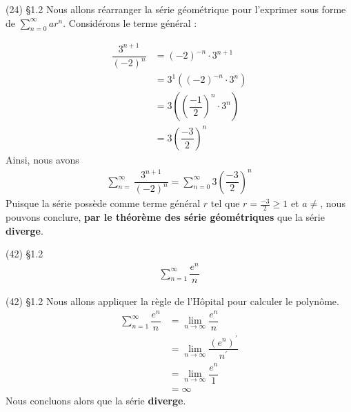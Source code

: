 \documentclass{report}
\begin{document}
\begin{multicols*}{3}
        \begin{Reponse}{(24) \S 1.2}{}
            Nous allons réarranger la série géométrique pour l'exprimer 
            sous forme de $\sum_{n=0}^{\infty }ar^n$. 
            Considérons le terme général : 

            \begin{align*}
                \dfrac{3^{n+1}}{(-2)^n} &= 
                (-2)^{-n}\cdot 3^{n+1} \\ 
                                    &=
                3^1\left( (-2)^{-n} \cdot 3^n \right) \\
                                    &= 
                3\left( \left(\dfrac{-1}{2}\right)^n \cdot 3^n \right) \\ 
                                    &= 
                3\left( \dfrac{-3}{2} \right)^n
            \end{align*}
            Ainsi, nous avons 
            \begin{align*}
                \sum_{n=}^{\infty}\dfrac{3^{n+1}}{(-2)^n} = 
                \sum_{n=0}^{\infty}3\left( \dfrac{-3}{2} \right)^n
            \end{align*}
            Puisque la série possède comme terme général $r$ tel que 
            $r =\frac{-3}{2} \geq 1$ et $a \neq$, nous pouvons 
            conclure, \textbf{par le théorème des série géométriques} 
            que la série \textbf{diverge}.   
           
        \end{Reponse}


        \begin{Exercice}{ (42) \S 1.2}{}
            \begin{align*}
                \sum_{n=1}^{\infty}\dfrac{e^n}{n}
            \end{align*}
        \end{Exercice}


        \begin{Reponse}{ (42) \S 1.2}{}
            Nous allons appliquer la règle de l'Hôpital pour calculer 
            le polynôme.  
            \begin{align*}
                \sum_{n=1}^{\infty}\dfrac{e^n}{n} &= 
                 \lim\limits_{n\to\infty}\dfrac{e^n}{n} \\ 
                                      & = 
            \lim\limits_{n\to\infty}\dfrac{(e^n)^{\prime}}{n^{\prime}} \\
                                    &=
            \lim\limits_{n\to\infty}\dfrac{e^n}{1} \\ 
                                    &= \infty
            \end{align*}
            Nous concluons alors que la série \textbf{diverge}.   
        \end{Reponse}




\end{multicols*}
\end{document}
